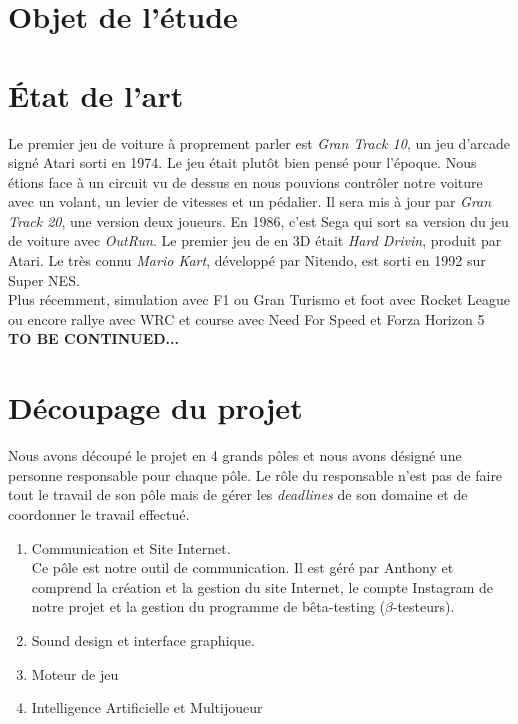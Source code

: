 \documentclass[11pt,a4paper]{article}
\begin{document}
\section{Objet de l'étude}

\clearpage

\section{État de l'art}
Le premier jeu de voiture à proprement parler est \textit{Gran Track 10}, un jeu d'arcade signé Atari 
sorti en 1974. Le jeu était plutôt bien pensé pour l'époque. Nous étions face à un 
circuit vu de dessus en nous pouvions contrôler notre voiture avec un volant, un levier de vitesses
et un pédalier. Il sera mis à jour par \textit{Gran Track 20}, une version deux joueurs.
En 1986, c'est Sega qui sort sa version du jeu de voiture avec \textit{OutRun}. Le premier 
jeu de en 3D était \textit{Hard Drivin}, produit par Atari. Le très connu \textit{Mario Kart},
développé par Nitendo, est sorti en 1992 sur Super NES.\\
\indent Plus récemment, simulation avec F1 ou Gran Turismo et foot avec Rocket League ou encore 
rallye avec WRC et course avec Need For Speed et Forza Horizon 5\\
\textbf{TO BE CONTINUED...}
\clearpage

\section{Découpage du projet}
Nous avons découpé le projet en 4 grands pôles et nous avons désigné une personne responsable
pour chaque pôle. Le rôle du responsable n'est pas de faire tout le travail de son pôle mais
de gérer les \textit{deadlines} de son domaine et de coordonner le travail effectué.
\begin{enumerate}
  \item Communication et Site Internet.\\
    Ce pôle est notre outil de communication. Il est géré par Anthony et comprend la création
    et la gestion du site Internet, le compte Instagram de notre projet \cite{insta} et la
    gestion du programme de bêta-testing (\(\beta\)-testeurs).
  \item Sound design et interface graphique.
  \item Moteur de jeu
  \item Intelligence Artificielle et Multijoueur
\end{enumerate}
\clearpage
\end{document}

